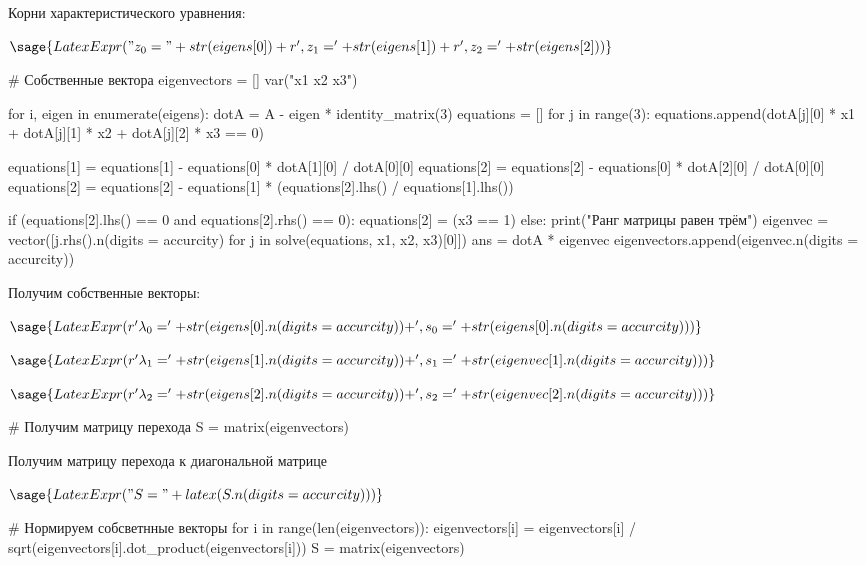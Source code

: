 \documentclass[14pt, a4paper]{article}
\begin{document}
Корни характеристического уравнения:

$\sage{LatexExpr("z_0 = " + str(eigens[0]) + r', z_1 = ' + str(eigens[1]) + r', z_2 = ' + str(eigens[2]))}$

\begin{sagesilent}
    # Собственные вектора
    eigenvectors = []
    var("x1 x2 x3")

    for i, eigen in enumerate(eigens):
        dotA = A - eigen * identity_matrix(3)    
        equations = []
        for j in range(3):
            equations.append(dotA[j][0] * x1 + dotA[j][1] * x2 + dotA[j][2] * x3 == 0)

        equations[1] = equations[1] - equations[0] * dotA[1][0] / dotA[0][0]
        equations[2] = equations[2] - equations[0] * dotA[2][0] / dotA[0][0]
        equations[2] = equations[2] - equations[1] * (equations[2].lhs() / equations[1].lhs())

        if (equations[2].lhs() == 0 and equations[2].rhs() == 0):
            equations[2] = (x3 == 1)
        else:
            print("Ранг матрицы равен трём")
        eigenvec = vector([j.rhs().n(digits = accurcity) for j in solve(equations, x1, x2, x3)[0]])
        ans = dotA * eigenvec
        eigenvectors.append(eigenvec.n(digits = accurcity))
\end{sagesilent}

Получим собственные векторы:

$\sage{LatexExpr(r'\lambda_0 = ' + str(eigens[0].n(digits = accurcity)) + ', s_0 = ' + str(eigens[0].n(digits = accurcity)))}$

$\sage{LatexExpr(r'\lambda_1 = ' + str(eigens[1].n(digits = accurcity)) + ', s_1 = ' + str(eigenvec[1].n(digits = accurcity)))}$

$\sage{LatexExpr(r'\lambda_2 = ' + str(eigens[2].n(digits = accurcity)) + ', s_2 = ' + str(eigenvec[2].n(digits = accurcity)))}$

\begin{sagesilent}
    # Получим матрицу перехода
    S = matrix(eigenvectors)
\end{sagesilent}

Получим матрицу перехода к диагональной матрице

$\sage{LatexExpr("S = " + latex(S.n(digits = accurcity)))}$

\begin{sagesilent}
    # Нормируем собсветнные векторы
    for i in range(len(eigenvectors)):
        eigenvectors[i] = eigenvectors[i] / sqrt(eigenvectors[i].dot_product(eigenvectors[i]))
    S = matrix(eigenvectors)
\end{sagesilent}
\end{document}
